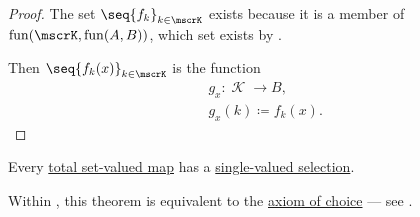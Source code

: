 \begin{proof}
   The set \( \seq{ f_k }_{k \in \mscrK} \) exists because it is a member of \( \fun(\mscrK, \fun(A, B)) \), which set exists by .

   Then \( \seq{ f_k(x) }_{k \in \mscrK} \) is the function
   \begin{equation*}
     \begin{aligned}
       &g_x: \mscrK \to B, \\
       &g_x(k) \coloneqq f_k(x).
     \end{aligned}
   \end{equation*}
\end{proof}

\begin{theorem}\label{thm:existence_of_single_valued_selections}
  Every \hyperref[def:set_valued_map/partial]{total set-valued map} has a \hyperref[def:function/selection]{single-valued selection}.
\end{theorem}
\begin{comments}
  \item Within \hyperref[def:zfc]{}, this theorem is equivalent to the \hyperref[def:zfc/choice]{axiom of choice} --- see .
\end{comments}
